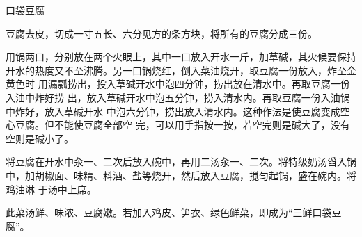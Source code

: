 %
%
%
%
%
%
%
\begin{recipe}{口袋豆腐}

\ingredients


\preparation

\step 豆腐去皮，切成一寸五长、六分见方的条方块，将所有的豆腐分成三份。

\step 用锅两口，分别放在两个火眼上，其中一口放入开水一斤，加草碱，其火候要保持
开水的热度又不至沸腾。另一口锅烧红，倒入菜油烧开，取豆腐一份放入，炸至金黄色时
用漏瓢捞出，投入草碱开水中泡四分钟，捞出放在清水中。再取豆腐一份入油中炸好捞
出，放入草碱开水中泡五分钟，捞入清水内。再取豆腐一份入油锅中炸好，放入草碱开水
中泡六分钟，捞出放入清水内。这种作法是使豆腐变成空心豆腐。但不能使豆腐全部空
完，可以用手指按一按，若空完则是碱大了，没有空则是碱小了。

\step 将豆腐在开水中汆一、二次后放入碗中，再用二汤汆一、二次。将特级奶汤舀入锅
中，加胡椒面、味精、料酒、盐等烧开，然后放入豆腐，搅匀起锅，盛在碗内。将鸡油淋
于汤中上席。

\features

此菜汤鲜、味浓、豆腐嫩。若加入鸡皮、笋衣、绿色鲜菜，即成为“三鲜口袋豆腐”。

\end{recipe}

